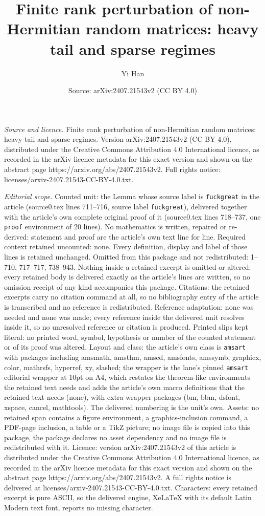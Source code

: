 \documentclass[10pt,a4paper]{amsart}
\title[Finite rank perturbation of non-Hermitian random matrices: h]{Finite rank perturbation of non-Hermitian random matrices: heavy tail and sparse regimes}
\author{Yi Han}
\date{Source: arXiv:2407.21543v2 (CC BY 4.0)}
\begin{document}
\maketitle

\noindent\emph{Source and licence.} Finite rank perturbation of non-Hermitian random matrices: heavy tail and sparse regimes. Version arXiv:2407.21543v2 (CC BY 4.0), distributed under the Creative Commons Attribution 4.0 International licence, as recorded in the arXiv licence metadata for this exact version and shown on the abstract page https://arxiv.org/abs/2407.21543v2. Full rights notice: licenses/arxiv-2407.21543-CC-BY-4.0.txt.\par\smallskip

\noindent\textit{Editorial scope.} Counted unit: the Lemma whose source label is \texttt{fuckgreat} in the article (source0.tex lines 711--716, source label \texttt{fuckgreat}), delivered together with the article's own complete original proof of it (source0.tex lines 718--737, one \texttt{proof} environment of 20 lines). No mathematics is written, repaired or re-derived: statement and proof are the article's own text line for line. Required context retained uncounted: none. Every definition, display and label of those lines is retained unchanged. Omitted from this package and not redistributed: 1--710, 717--717, 738--943. Nothing inside a retained excerpt is omitted or altered: every retained body is delivered exactly as the article's lines are written, so no omission receipt of any kind accompanies this package. Citations: the retained excerpts carry no citation command at all, so no bibliography entry of the article is transcribed and no reference is redistributed. Reference adaptation: none was needed and none was made; every reference inside the delivered unit resolves inside it, so no unresolved reference or citation is produced. Printed slips kept literal: no printed word, symbol, hypothesis or number of the counted statement or of its proof was altered. Layout and class: the article's own class is \texttt{amsart} with packages including amsmath, amsthm, amscd, amsfonts, amssymb, graphicx, color, mathrsfs, hyperref, xy, slashed; the wrapper is the lane's pinned \texttt{amsart} editorial wrapper at 10pt on A4, which restates the theorem-like environments the retained text needs and adds the article's own macro definitions that the retained text needs (none), with extra wrapper packages (bm, bbm, dsfont, xspace, cancel, mathtools). The delivered numbering is the unit's own. Assets: no retained span contains a figure environment, a graphics-inclusion command, a PDF-page inclusion, a table or a TikZ picture; no image file is copied into this package, the package declares no asset dependency and no image file is redistributed with it. Licence: version arXiv:2407.21543v2 of this article is distributed under the Creative Commons Attribution 4.0 International licence, as recorded in the arXiv licence metadata for this exact version and shown on the abstract page https://arxiv.org/abs/2407.21543v2. A full rights notice is delivered at licenses/arxiv-2407.21543-CC-BY-4.0.txt. Characters: every retained excerpt is pure ASCII, so the delivered engine, XeLaTeX with its default Latin Modern text font, reports no missing character.
\end{document}

